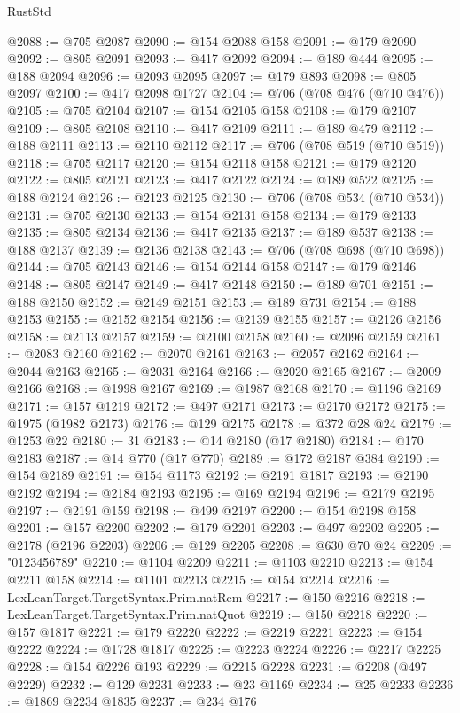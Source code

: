 \begin{lexlean}{RustStd}
\begin{coremodule}
@2088 := @705 @2087
@2090 := @154 @2088 @158
@2091 := @179 @2090
@2092 := @805 @2091
@2093 := @417 @2092
@2094 := @189 @444
@2095 := @188 @2094
@2096 := @2093 @2095
@2097 := @179 @893
@2098 := @805 @2097
@2100 := @417 @2098 @1727
@2104 := @706 (@708 @476 (@710 @476))
@2105 := @705 @2104
@2107 := @154 @2105 @158
@2108 := @179 @2107
@2109 := @805 @2108
@2110 := @417 @2109
@2111 := @189 @479
@2112 := @188 @2111
@2113 := @2110 @2112
@2117 := @706 (@708 @519 (@710 @519))
@2118 := @705 @2117
@2120 := @154 @2118 @158
@2121 := @179 @2120
@2122 := @805 @2121
@2123 := @417 @2122
@2124 := @189 @522
@2125 := @188 @2124
@2126 := @2123 @2125
@2130 := @706 (@708 @534 (@710 @534))
@2131 := @705 @2130
@2133 := @154 @2131 @158
@2134 := @179 @2133
@2135 := @805 @2134
@2136 := @417 @2135
@2137 := @189 @537
@2138 := @188 @2137
@2139 := @2136 @2138
@2143 := @706 (@708 @698 (@710 @698))
@2144 := @705 @2143
@2146 := @154 @2144 @158
@2147 := @179 @2146
@2148 := @805 @2147
@2149 := @417 @2148
@2150 := @189 @701
@2151 := @188 @2150
@2152 := @2149 @2151
@2153 := @189 @731
@2154 := @188 @2153
@2155 := @2152 @2154
@2156 := @2139 @2155
@2157 := @2126 @2156
@2158 := @2113 @2157
@2159 := @2100 @2158
@2160 := @2096 @2159
@2161 := @2083 @2160
@2162 := @2070 @2161
@2163 := @2057 @2162
@2164 := @2044 @2163
@2165 := @2031 @2164
@2166 := @2020 @2165
@2167 := @2009 @2166
@2168 := @1998 @2167
@2169 := @1987 @2168
@2170 := @1196 @2169
@2171 := @157 @1219
@2172 := @497 @2171
@2173 := @2170 @2172
@2175 := @1975 (@1982 @2173)
@2176 := @129 @2175
@2178 := @372 @28 @24
@2179 := @1253 @22
@2180 := 31
@2183 := @14 @2180 (@17 @2180)
@2184 := @170 @2183
@2187 := @14 @770 (@17 @770)
@2189 := @172 @2187 @384
@2190 := @154 @2189
@2191 := @154 @1173
@2192 := @2191 @1817
@2193 := @2190 @2192
@2194 := @2184 @2193
@2195 := @169 @2194
@2196 := @2179 @2195
@2197 := @2191 @159
@2198 := @499 @2197
@2200 := @154 @2198 @158
@2201 := @157 @2200
@2202 := @179 @2201
@2203 := @497 @2202
@2205 := @2178 (@2196 @2203)
@2206 := @129 @2205
@2208 := @630 @70 @24
@2209 := "0123456789"
@2210 := @1104 @2209
@2211 := @1103 @2210
@2213 := @154 @2211 @158
@2214 := @1101 @2213
@2215 := @154 @2214
@2216 := LexLeanTarget.TargetSyntax.Prim.natRem
@2217 := @150 @2216
@2218 := LexLeanTarget.TargetSyntax.Prim.natQuot
@2219 := @150 @2218
@2220 := @157 @1817
@2221 := @179 @2220
@2222 := @2219 @2221
@2223 := @154 @2222
@2224 := @1728 @1817
@2225 := @2223 @2224
@2226 := @2217 @2225
@2228 := @154 @2226 @193
@2229 := @2215 @2228
@2231 := @2208 (@497 @2229)
@2232 := @129 @2231
@2233 := @23 @1169
@2234 := @25 @2233
@2236 := @1869 @2234 @1835
@2237 := @234 @176

\end{coremodule}
\end{lexlean}

